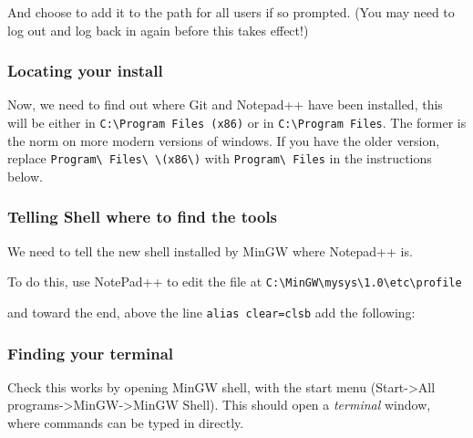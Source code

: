 And choose to add it to the path for all users if so prompted. (You may
need to log out and log back in again before this takes effect!)

\subsubsection{Locating your install}\label{locating-your-install}

Now, we need to find out where Git and Notepad++ have been installed,
this will be either in \texttt{C:\textbackslash{}Program Files (x86)} or
in \texttt{C:\textbackslash{}Program Files}. The former is the norm on
more modern versions of windows. If you have the older version, replace
\texttt{Program\textbackslash{} Files\textbackslash{} \textbackslash{}(x86\textbackslash{})}
with \texttt{Program\textbackslash{} Files} in the instructions below.

\subsubsection{Telling Shell where to find the
tools}\label{telling-shell-where-to-find-the-tools}

We need to tell the new shell installed by MinGW where Notepad++ is.

To do this, use NotePad++ to edit the file at
\texttt{C:\textbackslash{}MinGW\textbackslash{}mysys\textbackslash{}1.0\textbackslash{}etc\textbackslash{}profile}

and toward the end, above the line \texttt{alias clear=clsb} add the
following:

\begin{Shaded}
\begin{Highlighting}[]
 \DataTypeTok{\textbackslash{} }\DataTypeTok{\textbackslash{} \textbackslash{}(}\DataTypeTok{\textbackslash{})}
\end{Highlighting}
\end{Shaded}

\subsubsection{Finding your terminal}\label{finding-your-terminal}

Check this works by opening MinGW shell, with the start menu
(Start-\textgreater{}All
programs-\textgreater{}MinGW-\textgreater{}MinGW Shell). This should
open a \emph{terminal} window, where commands can be typed in directly.

